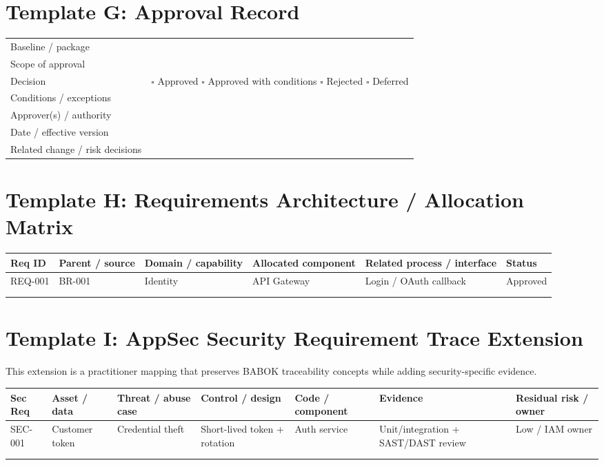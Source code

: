 \documentclass[11pt]{article}
\begin{document}
\section{Template G: Approval Record}
\begin{longtable}{L{0.26\textwidth} L{0.62\textwidth}}
\toprule
Baseline / package & \\
Scope of approval & \vspace{0.20in}\\
Decision & $\square$ Approved \quad $\square$ Approved with conditions \quad $\square$ Rejected \quad $\square$ Deferred\\
Conditions / exceptions & \vspace{0.28in}\\
Approver(s) / authority & \vspace{0.18in}\\
Date / effective version & \\
Related change / risk decisions & \vspace{0.20in}\\
\bottomrule
\end{longtable}
\section{Template H: Requirements Architecture / Allocation Matrix}
\small
\begin{longtable}{L{0.12\textwidth} L{0.18\textwidth} L{0.18\textwidth} L{0.16\textwidth} L{0.16\textwidth} L{0.10\textwidth}}
\toprule
Req ID & Parent / source & Domain / capability & Allocated component & Related process / interface & Status\\
\midrule
REQ-001 & BR-001 & Identity & API Gateway & Login / OAuth callback & Approved\\
 & & & & & \\
 & & & & & \\
\bottomrule
\end{longtable}
\normalsize
\section{Template I: AppSec Security Requirement Trace Extension}
This extension is a practitioner mapping that preserves BABOK traceability concepts while adding security-specific evidence.
\small
\begin{longtable}{L{0.10\textwidth} L{0.13\textwidth} L{0.13\textwidth} L{0.13\textwidth} L{0.13\textwidth} L{0.13\textwidth} L{0.10\textwidth}}
\toprule
Sec Req & Asset / data & Threat / abuse case & Control / design & Code / component & Evidence & Residual risk / owner\\
\midrule
SEC-001 & Customer token & Credential theft & Short-lived token + rotation & Auth service & Unit/integration + SAST/DAST review & Low / IAM owner\\
 & & & & & & \\
 & & & & & & \\
\bottomrule
\end{longtable}
\normalsize
\end{document}
